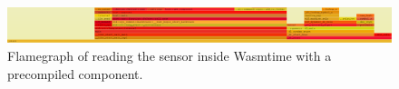 \begin{figure}
  \centering
  \includegraphics[width=\textwidth,keepaspectratio]{figures/compiled_sensor_flamegraph}
  \caption{Flamegraph of reading the sensor inside Wasmtime with a precompiled component.}
  \label{fig:flamegraph:sensor}
\end{figure}

